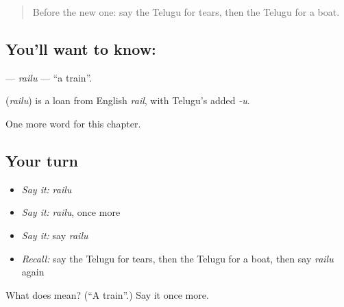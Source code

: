 \label{lesson:TE-C133-railu}



\begin{quote}
Before the new one: say the Telugu for tears, then the Telugu for a boat.
\end{quote}

\subsection*{You'll want to know: }
\textbf{} — \emph{railu} — \textquotedblleft{}a train\textquotedblright{}.

\begin{cousinweb}
\textbf{} (\emph{railu}) is a loan from English \emph{rail}, with Telugu's added \emph{-u}.
\end{cousinweb}

\begin{grammarlens}[title={What you've built}]
One more word for this chapter.
\end{grammarlens}

\subsection*{Your turn}
\begin{itemize}
\raggedright
  \item \emph{Say it:} \emph{railu}
  \item \emph{Say it:} \emph{railu}, once more
  \item \emph{Say it:} say \emph{railu}
  \item \emph{Recall:} say the Telugu for tears, then the Telugu for a boat, then say \emph{railu} again
\end{itemize}

\begin{tcolorbox}[breakable,colback=teal!4,colframe=teal!35!black,title={Before you move on}]
What does  mean? (\textquotedblleft{}A train\textquotedblright{}.) Say it once more.
\end{tcolorbox}
